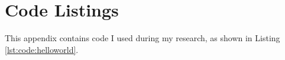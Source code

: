 \chapter{Code Listings}
\label{app:code}

This appendix contains code I used during my research, as shown in Listing \ref{lst:code:helloworld}.

